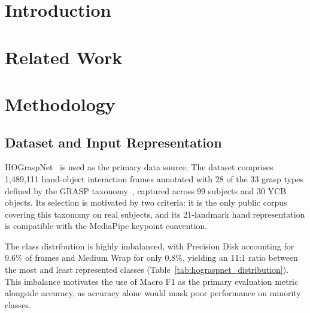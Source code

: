 \documentclass[letterpaper, 10 pt, conference]{ieeeconf}  %
\begin{document}
\section{Introduction}

\section{Related Work}


\section{Methodology}

\subsection{Dataset and Input Representation}

HOGraspNet~\cite{cho_densehan2024} is used as the primary data source. The dataset comprises 1,489,111 hand-object interaction frames annotated with 28 of the 33 grasp types defined by the GRASP taxonomy~\cite{feix_grasptax2016}, captured across 99 subjects and 30 YCB objects. Its selection is motivated by two criteria: it is the only public corpus covering this taxonomy on real subjects, and its 21-landmark hand representation is compatible with the MediaPipe keypoint convention.

The class distribution is highly imbalanced, with Precision Disk accounting for 9.6\% of frames and Medium Wrap for only 0.8\%, yielding an 11:1 ratio between the most and least represented classes (Table~\ref{tab:hograspnet_distribution}). This imbalance motivates the use of Macro F1 as the primary evaluation metric alongside accuracy, as accuracy alone would mask poor performance on minority classes.
\end{document}
